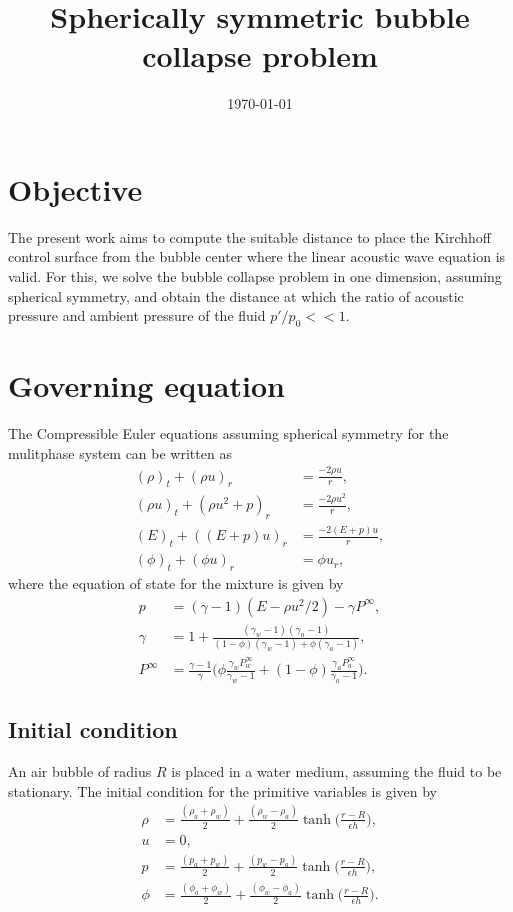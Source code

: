 \documentclass[a4paper]{article}
\title{Spherically symmetric bubble collapse problem}
\author{}
\date{\today}
\begin{document}
\maketitle
\section*{Objective}
The present work aims to compute the suitable distance to place the Kirchhoff control surface from the bubble center where the linear acoustic wave equation is valid. For this, we solve the bubble collapse problem in one dimension, assuming spherical symmetry, and obtain the distance at which the ratio of acoustic pressure and ambient pressure of the fluid $p'/p_0 << 1$.  
\section*{Governing equation}
The Compressible Euler equations assuming spherical symmetry for the mulitphase system can be written as
\begin{align}
    (\rho)_t + (\rho u)_r &= \frac{-2\rho u}{r},\\
    (\rho u)_t + (\rho u^2 + p)_r &= \frac{-2\rho u^2}{r}, \\
    (E)_t + ((E + p) u)_r &= \frac{-2(E + p) u}{r},\\
    (\phi)_t + (\phi u)_r &= \phi u_r,
\end{align}
where the equation of state for the mixture is given by 
\begin{align}
    p &= (\gamma - 1)(E - \rho u^2/2) - \gamma P^{\infty},\\    
    \gamma &= 1 + \frac{(\gamma_w - 1)(\gamma_a - 1)}{(1 - \phi)(\gamma_w - 1) + \phi(\gamma_a  - 1)},\\
    P^{\infty} &= \frac{\gamma - 1}{\gamma}\Big( \phi \frac{\gamma_w P^\infty_w}{\gamma_w - 1}  +(1 - \phi)\frac{\gamma_a P^\infty_a}{\gamma_a - 1} \Big). 
\end{align}
\subsection*{Initial condition}
An air bubble of radius $R$ is placed in a water medium, assuming the fluid to be stationary. The initial condition for the primitive variables is given by
\begin{align}
    \rho &= \frac{(\rho_a + \rho_w)}{2} + \frac{(\rho_w - \rho_a)}{2}{\tanh\Big(\frac{r - R}{\epsilon h}}\Big),\\
    u &= 0,\\
    p &= \frac{(p_a + p_w)}{2} + \frac{(p_w - p_a)}{2}{\tanh\Big(\frac{r - R}{\epsilon h}}\Big),\\    
    \phi &= \frac{(\phi_a + \phi_w)}{2} + \frac{(\phi_w - \phi_a)}{2}{\tanh\Big(\frac{r - R}{\epsilon h}}\Big).
\end{align}
\end{document}
